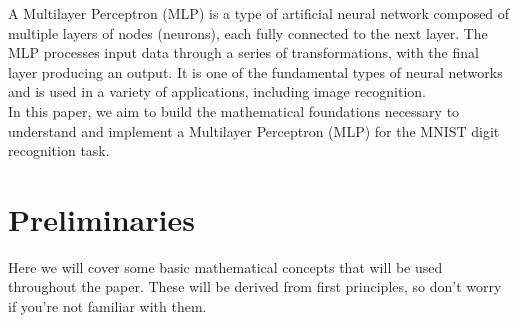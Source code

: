 \documentclass[9pt]{extarticle}
\theoremstyle{plain}
\theoremstyle{definition}
\theoremstyle{remark}
\begin{document}
\vspace{0.4cm}
\noindent A Multilayer Perceptron (MLP) is a type of artificial neural network composed of multiple
layers of nodes (neurons), each fully connected to the next layer. The MLP processes input data through
a series of transformations, with the final layer producing an output. It is one of the fundamental types
of neural networks and is used in a variety of applications, including image recognition. \\[2ex]
In this paper, we aim to build the mathematical foundations necessary to understand and implement a
Multilayer Perceptron (MLP) for the MNIST digit recognition task.

\pagebreak

\tableofcontents

\pagebreak
\section*{Preliminaries}
Here we will cover some basic mathematical concepts that will be used throughout the paper. These will be derived from first principles, so don't worry if you're not familiar with them.
\end{document}
